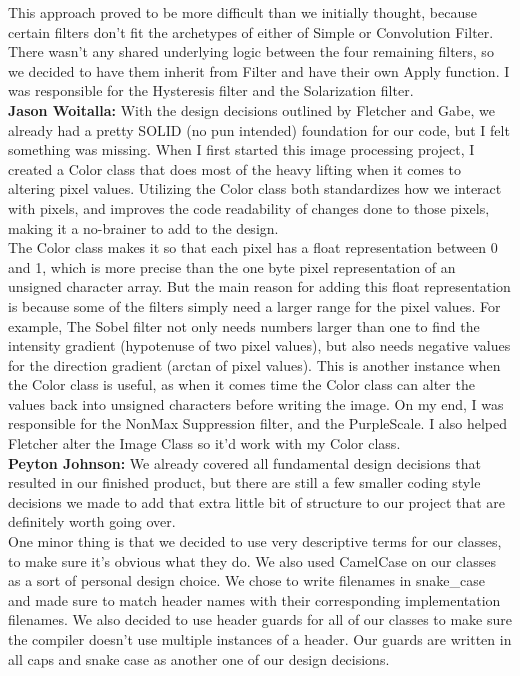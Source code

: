 This approach proved to be more difficult than we initially thought, because certain 
filters don't fit the archetypes of either of Simple or Convolution Filter. There wasn't any shared underlying logic between the four remaining filters, so we decided to have them inherit from Filter and have their own Apply function.  I was responsible for the Hysteresis filter and the Solarization filter. \\

\textbf{Jason Woitalla:}
With the design decisions outlined by Fletcher and Gabe, we already had a pretty SOLID (no pun 
intended) foundation for our code, but I felt something was missing.  When I first started this 
image processing project, I created a Color class that does most of the heavy lifting when it comes 
to altering pixel values.  Utilizing the Color class both standardizes how we interact with pixels, and improves the code readability of changes done to those pixels, making it a no-brainer to add to the design. \\ 

The Color class makes it so that each pixel has a float representation between 0 and 1, which is more 
precise than the one byte pixel representation of an unsigned character array. 
But the main reason for adding this float representation is because some of the filters simply need a larger 
range for the pixel values.  For example, The Sobel filter not only needs numbers larger than one 
to find the intensity gradient (hypotenuse of two pixel values), but also needs negative values 
for the direction gradient (arctan of pixel values).  This is another instance when the Color class is useful, 
as when it comes time the Color class can alter the values back into unsigned 
characters before writing the image. On my end, I was responsible for the 
NonMax Suppression filter, and the PurpleScale.  I also helped Fletcher alter the Image Class so 
it'd work with my Color class. \\

\textbf{Peyton Johnson:}
We already covered all fundamental design decisions that resulted in our finished product, but 
there are still a few smaller coding style decisions we made to add that extra little bit of 
structure to our project that are definitely worth going over. \\

One minor thing is that we decided to use very descriptive terms for our classes, to make sure 
it's obvious what they do.  We also used CamelCase on our classes as a sort of personal design 
choice.  We chose to write filenames in snake\_case and made sure to match header names 
with their corresponding implementation filenames.  We also decided to use header guards 
for all of our classes to make sure the compiler doesn't use multiple instances of a header.  Our 
guards are written in all caps and snake case as another one of our design decisions. \\


